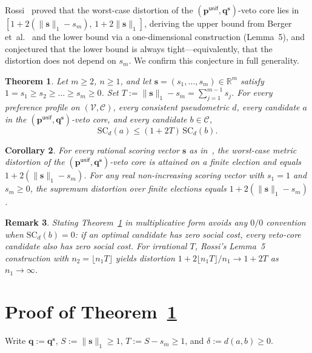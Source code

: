 \documentclass[11pt]{article}
\newtheorem{theorem}{Theorem}
\newtheorem{corollary}[theorem]{Corollary}
\newtheorem{remark}[theorem]{Remark}
\newcommand{\SC}{\mathrm{SC}}
\newcommand{\unif}{\mathsf{unif}}
\begin{document}
Rossi~\cite[Theorem~3.1]{Rossi2026} proved that the worst-case distortion of the $(\mathbf{p}^{\unif}, \mathbf{q}^{\mathbf{s}})$-veto core lies in $[1 + 2(\|\mathbf{s}\|_1 - s_m),\, 1 + 2\|\mathbf{s}\|_1]$, deriving the upper bound from Berger et~al.~\cite{BFGT2024} and the lower bound via a one-dimensional construction (Lemma~5), and conjectured that the lower bound is always tight—equivalently, that the distortion does not depend on $s_m$. We confirm this conjecture in full generality.

\begin{theorem}\label{thm:main}
Let $m \ge 2$, $n \ge 1$, and let $\mathbf{s} = (s_1, \dots, s_m) \in \mathbb{R}^m$ satisfy $1 = s_1 \ge s_2 \ge \dots \ge s_m \ge 0$. Set $T := \|\mathbf{s}\|_1 - s_m = \sum_{j=1}^{m-1} s_j$. For every preference profile on $(\mathcal{V}, \mathcal{C})$, every consistent pseudometric $d$, every candidate $a$ in the $(\mathbf{p}^{\unif}, \mathbf{q}^{\mathbf{s}})$-veto core, and every candidate $b \in \mathcal{C}$,
\[
\SC_d(a) \le (1 + 2T)\,\SC_d(b).
\]
\end{theorem}

\begin{corollary}
For every rational scoring vector $\mathbf{s}$ as in~\cite[Definition~1]{Rossi2026}, the worst-case metric distortion of the $(\mathbf{p}^{\unif}, \mathbf{q}^{\mathbf{s}})$-veto core is attained on a finite election and equals $1 + 2(\|\mathbf{s}\|_1 - s_m)$. For any real non-increasing scoring vector with $s_1 = 1$ and $s_m \ge 0$, the supremum distortion over finite elections equals $1 + 2(\|\mathbf{s}\|_1 - s_m)$.
\end{corollary}

\begin{remark}
Stating Theorem~\ref{thm:main} in multiplicative form avoids any $0/0$ convention when $\SC_d(b) = 0$: if an optimal candidate has zero social cost, every veto-core candidate also has zero social cost. For irrational $T$, Rossi's Lemma~5 construction with $n_2 = \lfloor n_1 T \rfloor$ yields distortion $1 + 2\lfloor n_1 T \rfloor / n_1 \to 1 + 2T$ as $n_1 \to \infty$.
\end{remark}

\section{Proof of Theorem~\ref{thm:main}}

Write $\mathbf{q} := \mathbf{q}^{\mathbf{s}}$, $S := \|\mathbf{s}\|_1 \ge 1$, $T := S - s_m \ge 1$, and $\delta := d(a, b) \ge 0$.
\end{document}
